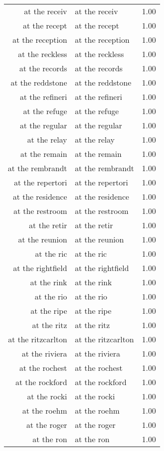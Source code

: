 \begin{table}[ht]
\begin{tabular}{rlr}
  at the receiv & at the receiv & 1.00 \\ 
  at the recept & at the recept & 1.00 \\ 
  at the reception & at the reception & 1.00 \\ 
  at the reckless & at the reckless & 1.00 \\ 
  at the records & at the records & 1.00 \\ 
  at the reddstone & at the reddstone & 1.00 \\ 
  at the refineri & at the refineri & 1.00 \\ 
  at the refuge & at the refuge & 1.00 \\ 
  at the regular & at the regular & 1.00 \\ 
  at the relay & at the relay & 1.00 \\ 
  at the remain & at the remain & 1.00 \\ 
  at the rembrandt & at the rembrandt & 1.00 \\ 
  at the repertori & at the repertori & 1.00 \\ 
  at the residence & at the residence & 1.00 \\ 
  at the restroom & at the restroom & 1.00 \\ 
  at the retir & at the retir & 1.00 \\ 
  at the reunion & at the reunion & 1.00 \\ 
  at the ric & at the ric & 1.00 \\ 
  at the rightfield & at the rightfield & 1.00 \\ 
  at the rink & at the rink & 1.00 \\ 
  at the rio & at the rio & 1.00 \\ 
  at the ripe & at the ripe & 1.00 \\ 
  at the ritz & at the ritz & 1.00 \\ 
  at the ritzcarlton & at the ritzcarlton & 1.00 \\ 
  at the riviera & at the riviera & 1.00 \\ 
  at the rochest & at the rochest & 1.00 \\ 
  at the rockford & at the rockford & 1.00 \\ 
  at the rocki & at the rocki & 1.00 \\ 
  at the roehm & at the roehm & 1.00 \\ 
  at the roger & at the roger & 1.00 \\ 
  at the ron & at the ron & 1.00 \\ 

\end{tabular}
\end{table}
